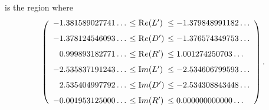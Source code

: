 \noindent is the region where
$$\left(\begin{array}{rll}
-1.381589027741\ldots &\hskip-6pt \le  {\mathrm Re}(L')&  \hskip-6pt\le  -1.379848991182\ldots\\[7pt]
-1.378124546093\ldots &\hskip-6pt \le  {\mathrm Re}(D')&\hskip-6pt  \le  -1.376574349753\ldots\\[7pt]
0.999893182771\ldots  &\hskip-6pt\le {\mathrm Re}(R')& \hskip-6pt  \le  1.001274250703\ldots\\[7pt]
-2.535837191243\ldots &\hskip-6pt \le  {\mathrm Im}(L')&\hskip-6pt  \le  -2.534606799593\ldots\\[7pt]
2.535404997792\ldots & \hskip-6pt\le  {\mathrm Im}(D') &\hskip-6pt \le  -2.534308843448\ldots\\[7pt]
-0.001953125000\ldots &\hskip-6pt \le {\mathrm  Im}(R')&\hskip-6pt  \le  0.000000000000\ldots
\end{array}\right).$$ 

